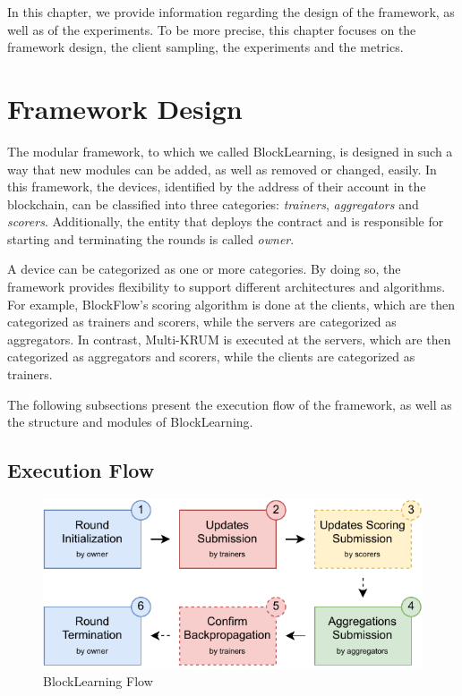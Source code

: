 In this chapter, we provide information regarding the design of the framework, as well as of the experiments. To be more precise, this chapter focuses on the framework design, the client sampling, the experiments and the metrics.

\section{Framework Design}\label{meth:framework_design}

The modular framework, to which we called BlockLearning, is designed in such a way that new modules can be added, as well as removed or changed, easily. In this framework, the devices, identified by the address of their account in the blockchain, can be classified into three categories: \textit{trainers}, \textit{aggregators} and \textit{scorers}. Additionally, the entity that deploys the contract and is responsible for starting and terminating the rounds is called \textit{owner}.

A device can be categorized as one or more categories. By doing so, the framework provides flexibility to support different architectures and algorithms. For example, BlockFlow's scoring algorithm is done at the clients, which are then categorized as trainers and scorers, while the servers are categorized as aggregators. In contrast, Multi-KRUM is executed at the servers, which are then categorized as aggregators and scorers, while the clients are categorized as trainers.

The following subsections present the execution flow of the framework, as well as the structure and modules of BlockLearning.

\subsection{Execution Flow}\label{meth:exec_flow}

\begin{figure}[!ht]
    \centering
    \includegraphics[width=1\textwidth]{graphics/sequence.pdf}
    \caption{BlockLearning Flow}
    \label{fig:blocklearning_steps}
\end{figure}

